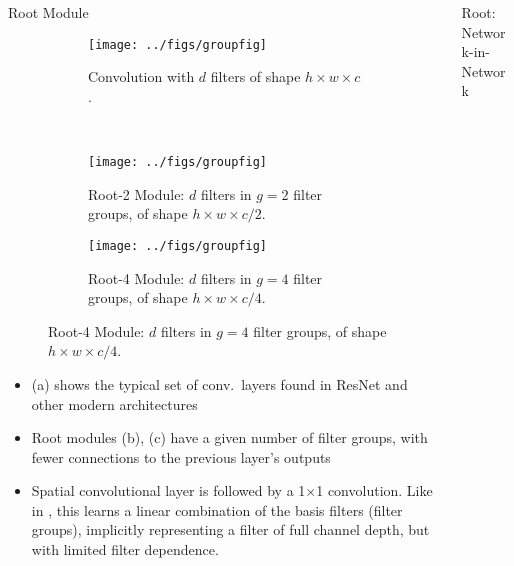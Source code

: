 \documentclass[final]{beamer}
\begin{document}
\begin{frame}{}
\begin{columns}[t]
\begin{column}{0.32\paperwidth}
\begin{block}{Root Module}
\begin{figure}[t]
\centering
\begin{subfigure}[b]{0.95\linewidth}
\centering
\texttt{[image: ../figs/groupfig]}
   \caption{Convolution with $d$ filters of shape $h\times w\times c$.}
   \label{fig:normalresnet}
\end{subfigure}\\
\begin{subfigure}[b]{0.95\linewidth}
\texttt{[image: ../figs/groupfig]}
   \caption{Root-2 Module: $d$ filters in $g = 2$ filter groups, of shape $h\times w\times c/2$.}
   \label{fig:rootresnet2}
\end{subfigure}
\begin{subfigure}[b]{0.95\linewidth}
\texttt{[image: ../figs/groupfig]}
   \caption{Root-4 Module: $d$ filters in $g = 4$ filter groups, of shape $h\times w\times c/4$.}
   \label{fig:rootresnet4}
\end{subfigure}
\label{fig:rootmodule}
\end{figure}
\begin{itemize}
    \item (a) shows the typical set of conv.\ layers found in ResNet and other modern architectures
    \item Root modules (b), (c) have a given number of filter groups, with fewer connections to the previous layer's outputs
    \item Spatial convolutional layer is followed by a 1$\times$1 convolution. Like in \citep{Ioannou2016}, this learns a linear combination of the basis filters (filter groups), implicitly representing a filter of full channel depth, but with limited filter dependence.
\end{itemize}
\end{block}
\end{column}

\begin{column}{0.66\paperwidth}

\begin{block}{Root: Network-in-Network}


\end{block}
\end{column}
\end{columns}
\end{frame}
\end{document}
